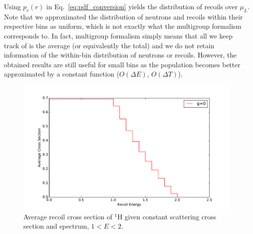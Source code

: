\documentclass[review]{elsarticle}
\begin{document}
Using $p_r(r)$ in Eq.~\ref{eq:pdf_conversion} yields the distribution of recoils over $\mu_L$. Note that we approximated the distribution of neutrons and recoils within their respective bins as uniform, which is not exactly what the multigroup formalism corresponds to. In fact, multigroup formalism simply means that all we keep track of is the average (or equivalently the total) and we do not retain information of the within-bin distribution of neutrons or recoils. However, the obtained results are still useful for small
bins as the population becomes better approximated by a constant function ($O(\Delta E)$, $O(\Delta T)$). 


\begin{figure}[t!]
	\centering
	\includegraphics[width=1\linewidth]{erxs_analytical.pdf}
	\caption{Average recoil cross section of $^1$H given constant scattering cross section and spectrum, $ 1 < E < 2$.}
	\label{fig:analytical}
\end{figure}


\end{document}
